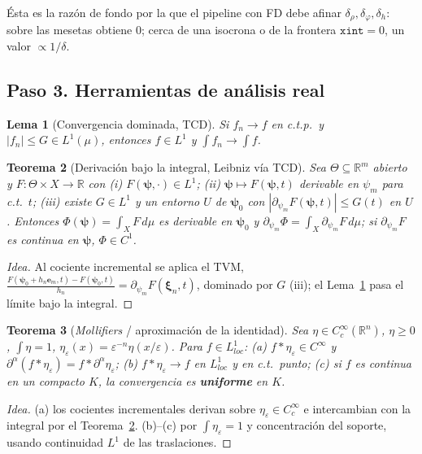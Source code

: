 \documentclass[11pt,a4paper]{article}
\theoremstyle{plain}
\newtheorem{theorem}{Teorema}
\newtheorem{lemma}[theorem]{Lema}
\theoremstyle{definition}
\newcommand{\vect}[1]{\boldsymbol{#1}}
\newcommand{\R}{\mathbb{R}}
\newcommand{\abs}[1]{\left\lvert #1 \right\rvert}
\begin{document}
\'Esta es la raz\'on de fondo por la que el pipeline con FD debe afinar
$\delta_\rho,\delta_\varphi,\delta_h$: sobre las mesetas obtiene $0$; cerca de una
isocrona o de la frontera $\texttt{xint}=0$, un valor $\propto1/\delta$.

\subsection*{Paso 3. Herramientas de an\'alisis real}
\label{sec:herramientas}

\begin{lemma}[Convergencia dominada, TCD]\label{lem:tcd}
Si $f_n\to f$ en c.t.p.\ y $\abs{f_n}\le G\in L^1(\mu)$, entonces $f\in L^1$ y
$\int f_n\to\int f$.
\end{lemma}

\begin{theorem}[Derivaci\'on bajo la integral, Leibniz v\'ia TCD]\label{thm:leibniz}
Sea $\Theta\subseteq\R^m$ abierto y $F:\Theta\times X\to\R$ con (i)
$F(\vect{\psi},\cdot)\in L^1$; (ii) $\vect{\psi}\mapsto F(\vect{\psi},t)$
derivable en $\psi_m$ para c.t.\ $t$; (iii) existe $G\in L^1$ y un entorno $U$ de
$\vect{\psi}_0$ con $\abs{\partial_{\psi_m}F(\vect{\psi},t)}\le G(t)$ en $U$.
Entonces $\Phi(\vect{\psi})=\int_X F\,d\mu$ es derivable en $\vect{\psi}_0$ y
$\partial_{\psi_m}\Phi=\int_X\partial_{\psi_m}F\,d\mu$; si $\partial_{\psi_m}F$ es
continua en $\vect{\psi}$, $\Phi\in C^1$.
\end{theorem}
\begin{proof}[Idea]
Al cociente incremental se aplica el TVM,
$\frac{F(\vect{\psi}_0+h_n\vect e_m,t)-F(\vect{\psi}_0,t)}{h_n}
=\partial_{\psi_m}F(\vect{\xi}_n,t)$, dominado por $G$ (iii); el
Lema~\ref{lem:tcd} pasa el l\'imite bajo la integral.
\end{proof}

\begin{theorem}[\emph{Mollifiers} / aproximaci\'on de la identidad]\label{thm:mollifier}
Sea $\eta\in C_c^\infty(\R^n)$, $\eta\ge0$, $\int\eta=1$,
$\eta_\varepsilon(x)=\varepsilon^{-n}\eta(x/\varepsilon)$. Para $f\in
L^1_{loc}$: (a) $f*\eta_\varepsilon\in C^\infty$ y
$\partial^\alpha(f*\eta_\varepsilon)=f*\partial^\alpha\eta_\varepsilon$;
(b) $f*\eta_\varepsilon\to f$ en $L^1_{loc}$ y en c.t.\ punto;
(c) si $f$ es continua en un compacto $K$, la convergencia es \textbf{uniforme}
en $K$.
\end{theorem}
\begin{proof}[Idea]
(a) los cocientes incrementales derivan sobre $\eta_\varepsilon\in C_c^\infty$ e
intercambian con la integral por el Teorema~\ref{thm:leibniz}. (b)--(c) por
$\int\eta_\varepsilon=1$ y concentraci\'on del soporte, usando continuidad $L^1$
de las traslaciones.
\end{proof}
\end{document}
